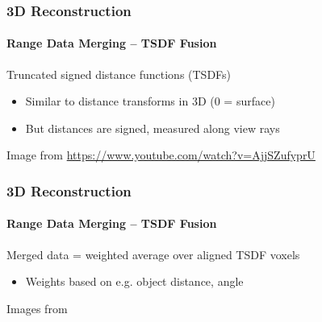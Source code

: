 \documentclass[xetex,professionalfont]{beamer}
\newcommand{\eg}{\mbox{e.g.}\xspace} %
\begin{document}
\begin{frame}
\frametitle{3D Reconstruction}
\framesubtitle{Range Data Merging -- TSDF Fusion}

Truncated signed distance functions (TSDFs)
\begin{itemize}
	\item Similar to distance transforms in 3D (0 = surface)
	\item But distances are signed, measured along view rays 
\end{itemize}

\begin{center}
    {\centering Image from \url{https://www.youtube.com/watch?v=AjjSZufyprU}}
\end{center}

\end{frame}


\begin{frame}
\frametitle{3D Reconstruction}
\framesubtitle{Range Data Merging -- TSDF Fusion}

Merged data = weighted average over aligned TSDF voxels %
\begin{itemize}
	\item Weights based on \eg object distance, angle
\end{itemize}

\begin{center}
    {\centering Images from \cite{curless1996}}
\end{center}

\end{frame}
\end{document}
